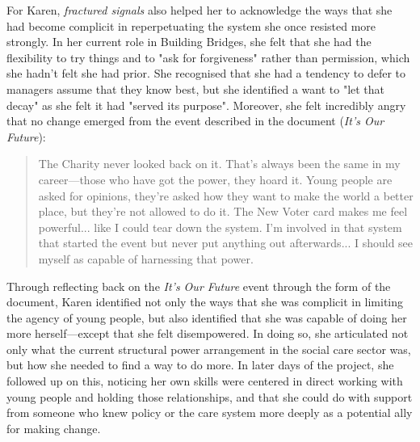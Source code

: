 For Karen, \textit{fractured signals} also helped her to acknowledge the ways that she had become complicit in reperpetuating the system she once resisted more strongly. In her current role in Building Bridges, she felt that she had the flexibility to try things and to "ask for forgiveness" rather than permission, which she hadn't felt she had prior. She recognised that she had a tendency to defer to managers assume that they know best, but she identified a want to "let that decay" as she felt it had "served its purpose". Moreover, she felt incredibly angry that no change emerged from the event described in the document (\textit{It's Our Future}):
\begin{quote}
The Charity never looked back on it. That's always been the same in my career—those who have got the power, they hoard it. Young people are asked for opinions, they're asked how they want to make the world a better place, but they're not allowed to do it. The New Voter card makes me feel powerful... like I could tear down the system. I'm involved in that system that started the event but never put anything out afterwards... I should see myself as capable of harnessing that power.
\end{quote}
Through reflecting back on the \textit{It's Our Future} event through the form of the document, Karen identified not only the ways that she was complicit in limiting the agency of young people, but also identified that she was capable of doing her more herself—except that she felt disempowered. In doing so, she articulated not only what the current structural power arrangement in the social care sector was, but how she needed to find a way to do more. In later days of the project, she followed up on this, noticing her own skills were centered in direct working with young people and holding those relationships, and that she could do with support from someone who knew policy or the care system more deeply as a potential ally for making change. 

